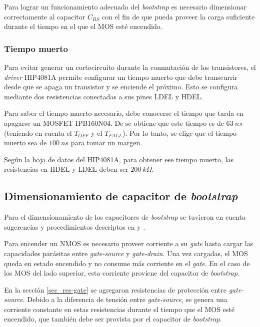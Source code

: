 Para lograr un funcionamiento adecuado del \textsl{bootstrap} es necesario dimensionar correctamente al capacitor $C_{BS}$ con el fin de que pueda proveer la carga suficiente durante el tiempo en el que el MOS esté encendido.

\subsubsection{Tiempo muerto}

\noindent Para evitar generar un cortocircuito durante la conmutación de los transistores, el \textsl{driver} HIP4081A permite configurar un tiempo muerto que debe transcurrir desde que se apaga un transistor y se enciende el próximo. Esto se configura mediante dos resistencias conectadas a sus pines LDEL y HDEL.

\noindent Para saber el tiempo muerto necesario, debe conocerse el tiempo que tarda en apagarse un MOSFET IPB160N04. De \cite{IPB160N04} se obtiene que este tiempo es de $63\:ns$ (teniendo en cuenta el $T_{OFF}$ y el $T_{FALL}$). Por lo tanto, se elige que el tiempo muerto sea de $100\:ns$ para tomar un margen.

\noindent Según la hoja de datos del HIP4081A, para obtener ese tiempo muerto, las resistencias en HDEL y LDEL deben ser $200\:k\Omega$.

\subsection{Dimensionamiento de capacitor de \textsl{bootstrap}}\label{sec_cap_bootstrap}

\noindent Para el dimensionamiento de los capacitores de \textsl{bootstrap} se tuvieron en cuenta sugerencias y procedimientos descriptos en \cite{HIP4081A_AN9405} y \cite{HIP4081A_FN3659}.

Para encender un NMOS es necesario proveer corriente a su \textsl{gate} hasta cargar las capacidades parásitas entre \textsl{gate-source} y \textsl{gate-drain}. Una vez cargadas, el MOS queda en estado encendido y no consume más corriente en el \textsl{gate}. En el caso de los MOS del lado superior, esta corriente proviene del capacitor de \textsl{bootstrap}.

En la sección \ref{sec_res-gate} se agregaron resistencias de protección entre \textsl{gate-source}. Debido a la diferencia de tensión entre \textsl{gate-source}, se genera una corriente constante en estas resistencias durante el tiempo que el MOS esté encendido, que también debe ser provista por el capacitor de \textsl{bootstrap}.

